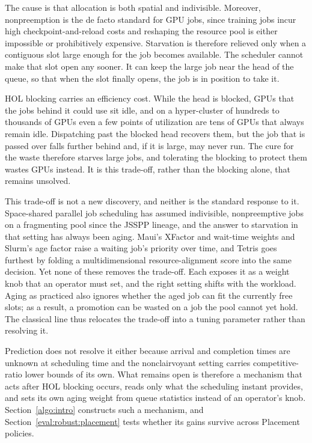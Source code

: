 \documentclass{ieeetj}
\begin{document}
The cause is that allocation is both spatial and indivisible. Moreover, nonpreemption is the de facto standard for GPU jobs, since training jobs incur high checkpoint-and-reload costs and reshaping the resource pool is either impossible or prohibitively expensive. Starvation is therefore relieved only when a contiguous slot large enough for the job becomes available. The scheduler cannot make that slot open any sooner. It can keep the large job near the head of the queue, so that when the slot finally opens, the job is in position to take it.

HOL blocking carries an efficiency cost. While the head is blocked, GPUs that the jobs behind it could use sit idle, and on a hyper-cluster of hundreds to thousands of GPUs even a few points of utilization are tens of GPUs that always remain idle. Dispatching past the blocked head recovers them, but the job that is passed over falls further behind and, if it is large, may never run. The cure for the waste therefore starves large jobs, and tolerating the blocking to protect them wastes GPUs instead. It is this trade-off, rather than the blocking alone, that remains unsolved.

This trade-off is not a new discovery, and neither is the standard response to it. Space-shared parallel job scheduling has assumed indivisible, nonpreemptive jobs on a fragmenting pool since the JSSPP lineage\cite{feitelson1996toward}, and the answer to starvation in that setting has always been aging. Maui's XFactor and wait-time weights\cite{jackson2001maui} and Slurm's age factor raise a waiting job's priority over time, and Tetris\cite{grandl2014multi} goes furthest by folding a multidimensional resource-alignment score into the same decision. Yet none of these removes the trade-off. Each exposes it as a weight knob that an operator must set, and the right setting shifts with the workload. Aging as practiced also ignores whether the aged job can fit the currently free slots; as a result, a promotion can be wasted on a job the pool cannot yet hold. The classical line thus relocates the trade-off into a tuning parameter rather than resolving it.

Prediction does not resolve it either because arrival and completion times are unknown at scheduling time and the nonclairvoyant setting carries competitive-ratio lower bounds of its own\cite{motwani1994nonclairvoyant}. What remains open is therefore a mechanism that acts after HOL blocking occurs, reads only what the scheduling instant provides, and sets its own aging weight from queue statistics instead of an operator's knob. Section~\ref{algo:intro} constructs such a mechanism, and Section~\ref{eval:robust:placement} tests whether its gains survive across Placement policies.
\end{document}
